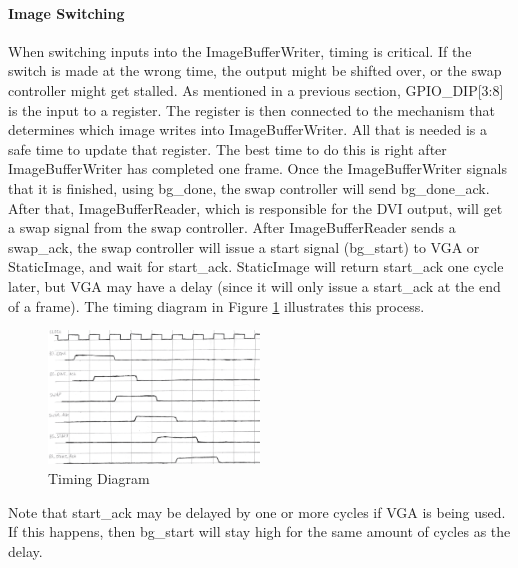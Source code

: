\paragraph{Image Switching}
When switching inputs into the ImageBufferWriter, timing is critical. If the switch is made at the wrong time, the output might be shifted over, or the swap controller might get stalled. As mentioned in a previous section, GPIO\_DIP[3:8] is the input to a register. The register is then connected to the mechanism that determines which image writes into ImageBufferWriter. All that is needed is a safe time to update that register. The best time to do this is right after ImageBufferWriter has completed one frame. Once the ImageBufferWriter signals that it is finished, using bg\_done, the swap controller will send bg\_done\_ack. After that, ImageBufferReader, which is responsible for the DVI output, will get a swap signal from the swap controller. After ImageBufferReader sends a swap\_ack, the swap controller will issue a start signal (bg\_start) to VGA or StaticImage, and wait for start\_ack. StaticImage will return start\_ack one cycle later, but VGA may have a delay (since it will only issue a start\_ack at the end of a frame). The timing diagram in Figure \ref{fig:timing_3} illustrates this process.

\begin{figure}
    \includegraphics[width=0.5\textwidth]{processed_image_pngs/timing_3.png}
    \caption{Timing Diagram}
    \label{fig:timing_3}
\end{figure}


Note that start\_ack may be delayed by one or more cycles if VGA is being used. If this happens, then bg\_start will stay high for the same amount of cycles as the delay.

